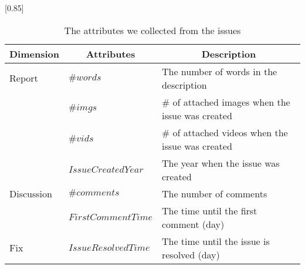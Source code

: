
\begin{table}[t]
    \begin{center}
    \caption{The attributes we collected from the issues}
    \scalebox{0.85}[0.85]{
    \begin{tabular}{llp{5cm}} 
        \toprule
        \multicolumn{1}{c}{\textbf{Dimension}}&\multicolumn{1}{c}{\textbf{Attributes}} & \multicolumn{1}{c}{\textbf{Description}} \\ 
        \midrule
        Report&$\#words$ & The number of words in the description \\
        &$\#imgs$ & \# of attached images when the issue was created \\
        &$\#vids$ & \# of attached videos when the issue was created \\
        &$IssueCreatedYear$ & The year when the issue was created \\
        \hline
        Discussion&$\#comments$ & The number of comments \\
        &$FirstCommentTime$ & The time until the first comment (day) \\
        
        \hline
        Fix&$IssueResolvedTime$ & The time until the issue is resolved (day) \\

        \bottomrule
    \end{tabular}
    }
    \label{tab:issue-attr}
    \end{center}
\end{table}
